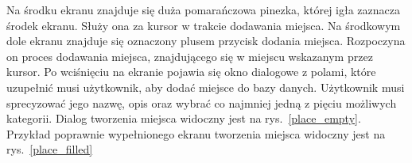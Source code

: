         Na środku ekranu znajduje się duża pomarańczowa pinezka, której igła zaznacza środek ekranu. Służy ona za kursor w trakcie dodawania miejsca. Na środkowym dole ekranu znajduje się oznaczony 
        plusem przycisk dodania miejsca. Rozpoczyna on proces dodawania miejsca, znajdującego się w miejscu wskazanym przez kursor. Po wciśnięciu na ekranie pojawia się okno dialogowe z polami, które uzupełnić
        musi użytkownik, aby dodać miejsce do bazy danych. Użytkownik musi sprecyzować jego nazwę, opis oraz wybrać co najmniej jedną z pięciu możliwych kategorii. Dialog tworzenia miejsca widoczny jest na 
        rys.~\ref{place_empty}. Przykład poprawnie wypełnionego ekranu tworzenia miejsca widoczny jest na rys.~\ref{place_filled}

        \vspace{1cm}
        \begin{figure}[H]%
            \centering
            \begin{subfigure}[b]{0.3\textwidth}
                \centering

\end{subfigure}
\end{figure}
